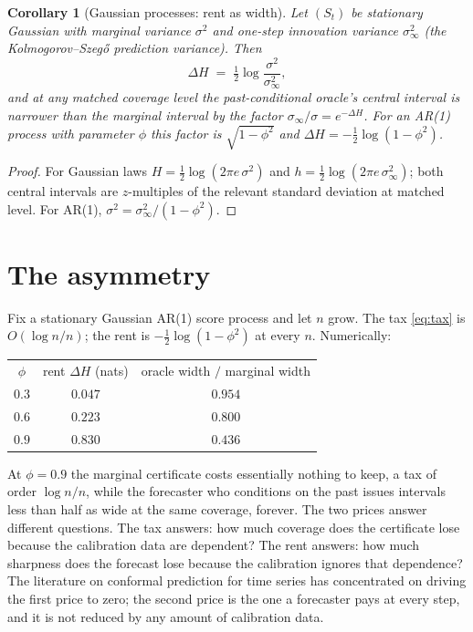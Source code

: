 \documentclass[11pt]{article}
\newtheorem{corollary}{Corollary}
\theoremstyle{remark}
\begin{document}
\begin{corollary}[Gaussian processes: rent as width]\label{cor:gauss}
Let $(S_t)$ be stationary Gaussian with marginal variance $\sigma^2$ and one-step innovation
variance $\sigma_\infty^2$ (the Kolmogorov--Szeg\H{o} prediction variance). Then
\[
\Delta H\;=\;\tfrac12\log\frac{\sigma^{2}}{\sigma_\infty^{2}},
\]
and at any matched coverage level the past-conditional oracle's central interval is narrower
than the marginal interval by the factor $\sigma_\infty/\sigma=e^{-\Delta H}$. For an AR(1)
process with parameter $\phi$ this factor is $\sqrt{1-\phi^{2}}$ and
$\Delta H=-\tfrac12\log(1-\phi^{2})$.
\end{corollary}

\begin{proof}
For Gaussian laws $H=\tfrac12\log(2\pi e\,\sigma^2)$ and $h=\tfrac12\log(2\pi e\,
\sigma_\infty^2)$; both central intervals are $z$-multiples of the relevant standard deviation at
matched level. For AR(1), $\sigma^2=\sigma_\infty^2/(1-\phi^2)$.
\end{proof}

\section{The asymmetry}\label{sec:asym}

Fix a stationary Gaussian AR(1) score process and let $n$ grow. The tax \eqref{eq:tax} is
$O(\log n/n)$; the rent is $-\tfrac12\log(1-\phi^2)$ at every $n$. Numerically:

\begin{center}
\begin{tabular}{c@{\qquad}c@{\qquad}c}
$\phi$ & rent $\Delta H$ (nats) & oracle width $/$ marginal width \\[2pt]
$0.3$ & $0.047$ & $0.954$ \\
$0.6$ & $0.223$ & $0.800$ \\
$0.9$ & $0.830$ & $0.436$ \\
\end{tabular}
\end{center}

At $\phi=0.9$ the marginal certificate costs essentially nothing to keep, a tax of order $\log n/n$, while the forecaster who conditions on the past issues intervals less than half as
wide at the same coverage, forever. The two prices answer different questions. The tax answers:
how much coverage does the certificate lose because the calibration data are dependent? The rent
answers: how much sharpness does the forecast lose because the calibration ignores that
dependence? The literature on conformal prediction for time series has concentrated on driving
the first price to zero; the second price is the one a forecaster pays at every step, and it is
not reduced by any amount of calibration data.
\end{document}
